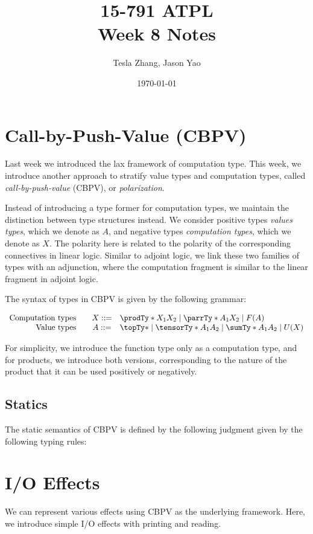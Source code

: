 \documentclass[letterpaper]{article}
\title{15-791 ATPL \\ Week 8 Notes}
\author{Tesla Zhang, Jason Yao}
\date{\today}
\begin{document}
\maketitle

\section{Call-by-Push-Value (CBPV)}
Last week we introduced the lax framework of computation type.
This week, we introduce another approach to stratify value types and computation types,
called \emph{call-by-push-value} (CBPV), or \emph{polarization}.

Instead of introducing a type former for computation types,
we maintain the distinction between type structures instead.
We consider positive types \emph{values types}, which we denote as $A$,
and negative types \emph{computation types}, which we denote as $X$.
The polarity here is related to the polarity of the corresponding connectives in linear logic.
Similar to adjoint logic, we link these two families of types with an adjunction,
where the computation fragment is similar to the linear fragment in adjoint logic.

The syntax of types in CBPV is given by the following grammar:

\[
    \begin{array}{rcl}
        \text{Computation types} \quad & X ::= & \prodTy*{X_1}{X_2} \mid \parrTy*{A_1}{X_2} \mid F(A) \\
        \text{Value types} \quad       & A ::= & \topTy* \mid \tensorTy*{A_1}{A_2} \mid \sumTy*{A_1}{A_2} \mid U(X) \\
    \end{array}
\]

For simplicity, we introduce the function type only as a computation type,
and for products, we introduce both versions, corresponding to the nature of the product that
it can be used positively or negatively.

\subsection{Statics}

The static semantics of CBPV is defined by the following judgment given by the following typing rules:

\begin{mathpar}
\end{mathpar}

\section{I/O Effects}
We can represent various effects using CBPV as the underlying framework. Here, we introduce simple I/O effects with printing and reading.
\end{document}
